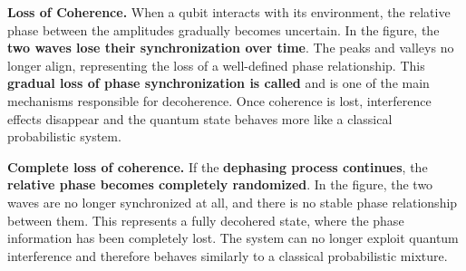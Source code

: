 \begin{itemize}
\begin{center}
    \end{center}

    \textcolor{Red2}{ \textbf{Loss of Coherence.}} When a qubit interacts with its environment, the relative phase between the amplitudes gradually becomes uncertain. In the figure, the \textbf{two waves lose their synchronization over time}. The peaks and valleys no longer align, representing the loss of a well-defined phase relationship. This \textbf{gradual loss of phase synchronization is called } and is one of the main mechanisms responsible for decoherence. Once coherence is lost, interference effects disappear and the quantum state behaves more like a classical probabilistic system.

    \begin{center}
    \end{center}

    \textcolor{Red2}{ \textbf{Complete loss of coherence.}} If the \textbf{dephasing process continues}, the \textbf{relative phase becomes completely randomized}. In the figure, the two waves are no longer synchronized at all, and there is no stable phase relationship between them. This represents a fully decohered state, where the phase information has been completely lost. The system can no longer exploit quantum interference and therefore behaves similarly to a classical probabilistic mixture.
    \begin{center}
\end{center}
\end{itemize}
